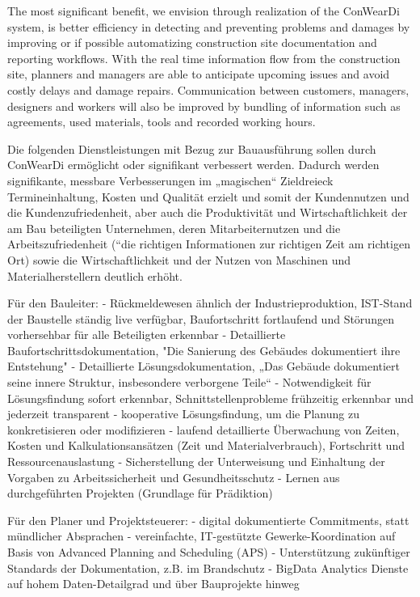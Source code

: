 The most significant benefit, we envision through realization of the ConWearDi system, is better efficiency in detecting and preventing problems and damages by improving or if possible automatizing construction site documentation and reporting workflows.
With the real time information flow from the construction site, planners and managers are able to anticipate upcoming issues and avoid costly delays and damage repairs.
Communication between customers, managers, designers and workers will also be improved by bundling of information such as agreements, used materials, tools and recorded working hours. 

Die folgenden Dienstleistungen mit Bezug zur Bauausführung sollen durch ConWearDi ermöglicht oder signifikant verbessert werden. Dadurch werden signifikante, messbare Verbesserungen im „magischen“ Zieldreieck Termineinhaltung, Kosten und Qualität erzielt und somit der  Kundennutzen und die Kundenzufriedenheit, aber auch die Produktivität und Wirtschaftlichkeit der am Bau beteiligten Unternehmen, deren Mitarbeiternutzen und die Arbeitszufriedenheit (“die richtigen Informationen zur richtigen Zeit am richtigen Ort) sowie die Wirtschaftlichkeit und der Nutzen von Maschinen und Materialherstellern deutlich erhöht.

Für den Bauleiter:
- Rückmeldewesen ähnlich der Industrieproduktion, IST-Stand der Baustelle ständig live verfügbar, Baufortschritt fortlaufend und Störungen vorhersehbar für alle Beteiligten erkennbar
- Detaillierte Baufortschrittsdokumentation, "Die Sanierung des Gebäudes dokumentiert ihre Entstehung"
- Detaillierte Lösungsdokumentation, „Das Gebäude dokumentiert seine innere Struktur, insbesondere verborgene Teile“
- Notwendigkeit für Lösungsfindung sofort erkennbar, Schnittstellenprobleme frühzeitig erkennbar und jederzeit transparent
- kooperative Lösungsfindung, um die  Planung zu  konkretisieren  oder  modifizieren 
- laufend detaillierte Überwachung von Zeiten, Kosten und Kalkulationsansätzen (Zeit und Materialverbrauch), Fortschritt und Ressourcenauslastung
- Sicherstellung der Unterweisung und Einhaltung der Vorgaben zu Arbeitssicherheit und Gesundheitsschutz
- Lernen aus durchgeführten Projekten (Grundlage für Prädiktion) 


Für den Planer und Projektsteuerer:
- digital dokumentierte Commitments, statt mündlicher Absprachen
- vereinfachte, IT-gestützte Gewerke-Koordination auf Basis von Advanced Planning and Scheduling (APS)
- Unterstützung zukünftiger Standards der Dokumentation, z.B. im Brandschutz
- BigData Analytics Dienste auf hohem Daten-Detailgrad und über Bauprojekte hinweg


